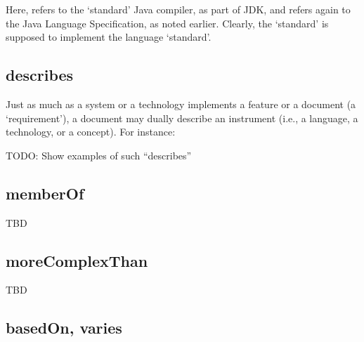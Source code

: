 
\noindent
Here,  refers to the `standard' Java compiler, as part
of JDK, and  refers again to the Java Language
Specification, as noted earlier. Clearly, the `standard' is supposed
to implement the language `standard'.


\subsection{describes}

Just as much as a system or a technology implements a feature or a
document (a `requirement'), a document may dually describe an
instrument (i.e., a language, a technology, or a concept). For
instance:

TODO: Show examples of such ``describes''


\subsection{memberOf}

TBD

\begin{comment}
Members of a theme
Members of a vocabulary
Members of a course
\end{comment}


\subsection{moreComplexThan}

TBD

\begin{comment}
Aha, moreComplexThan!?
- A contribution being more complex than another contribution
- A feature being more complex than another feature
- Does this sound like something applicable to language subset relationship?
\end{comment}


\subsection{basedOn, varies}

